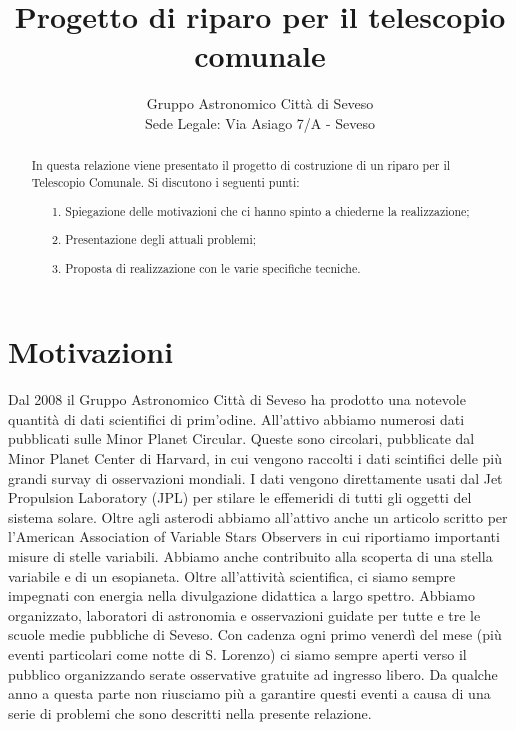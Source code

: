 \documentclass[a4paper,12pt]{article}
\begin{document}
\title{\bf \Huge Progetto di riparo per il telescopio comunale\\ }


\author{Gruppo Astronomico Città di Seveso\\
Sede Legale: Via Asiago 7/A - Seveso
}


\maketitle
\begin{abstract}
In questa relazione viene presentato il progetto di costruzione di un riparo per il Telescopio Comunale. Si discutono i seguenti punti:
	\begin{itemize}
		\item[1.] Spiegazione delle motivazioni che ci hanno spinto a chiederne la realizzazione;
		\item[2.] Presentazione degli attuali problemi;
		\item[3.] Proposta di realizzazione con le varie specifiche tecniche.
	\end{itemize}
\end{abstract}

\section{Motivazioni}
Dal 2008 il Gruppo Astronomico Citt\`a di Seveso ha prodotto una notevole quantit\`a di dati scientifici di prim'odine. All'attivo abbiamo numerosi dati pubblicati sulle Minor Planet Circular. Queste sono circolari, pubblicate dal Minor Planet Center di Harvard, in cui vengono raccolti i dati scintifici delle pi\`u grandi survay di osservazioni mondiali. I dati vengono direttamente usati dal Jet Propulsion Laboratory (JPL) per stilare le effemeridi di tutti gli oggetti del sistema solare. Oltre agli asterodi abbiamo all'attivo anche un articolo scritto per l'American Association of Variable Stars Observers in cui riportiamo importanti misure di stelle variabili. Abbiamo anche contribuito alla scoperta di una stella variabile e di un esopianeta. Oltre all'attivit\`a scientifica, ci siamo sempre impegnati con energia nella divulgazione didattica a largo spettro. Abbiamo organizzato, laboratori di astronomia e osservazioni guidate per tutte e tre le scuole medie pubbliche di Seveso. Con cadenza ogni primo venerd\`i del mese (pi\`u eventi particolari come notte di S. Lorenzo) ci siamo sempre aperti verso il pubblico organizzando serate osservative gratuite ad ingresso libero. Da qualche anno a questa parte non riusciamo pi\`u a garantire questi eventi a causa di una serie di problemi che sono descritti nella presente relazione.
\end{document}
